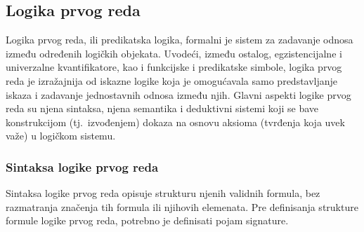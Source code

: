 \documentclass[a4paper,10pt]{article}
\begin{document}
\subsection{Logika prvog reda}
\label{subsec:logika_prvog_reda}

Logika prvog reda, ili predikatska logika, formalni je sistem za zadavanje odnosa između određenih logičkih objekata. Uvodeći, između ostalog, egzistencijalne i univerzalne kvantifikatore, kao i funkcijske i predikatske simbole, logika prvog reda je izražajnija od iskazne logike koja je omogućavala samo predstavljanje iskaza i zadavanje jednostavnih odnosa između njih. Glavni aspekti logike prvog reda su njena sintaksa, njena semantika i deduktivni sistemi koji se bave konstrukcijom (tj.~izvođenjem) dokaza na osnovu aksioma (tvrđenja koja uvek važe) u logičkom sistemu.

\subsubsection{Sintaksa logike prvog reda}

Sintaksa logike prvog reda opisuje strukturu njenih validnih formula, bez razmatranja značenja tih formula ili njihovih elemenata. Pre definisanja strukture formule logike prvog reda, potrebno je definisati pojam signature.
\end{document}

